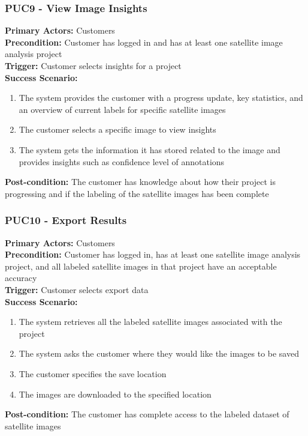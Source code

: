 \documentclass[12pt]{article}
\begin{document}
\subsubsection*{PUC9 - View Image Insights}
\label{sec:PUC9}
\textbf{Primary Actors:} Customers\\
\textbf{Precondition:} Customer has logged in and has at least one satellite image analysis project\\
\textbf{Trigger:} Customer selects insights for a project\\
\textbf{Success Scenario:}
\begin{enumerate}
    \item The system provides the customer with a progress update, key statistics, and an overview of current labels for specific satellite images
    \item The customer selects a specific image to view insights 
    \item The system gets the information it has stored related to the image and provides insights such as confidence level of annotations
\end{enumerate}
\textbf{Post-condition:} The customer has knowledge about how their project is progressing and if the labeling of the satellite images has been complete

\subsubsection*{PUC10 - Export Results}
\label{sec:PUC10}
\textbf{Primary Actors:} Customers\\
\textbf{Precondition:} Customer has logged in, has at least one satellite image analysis project, and all labeled satellite images in that project have an acceptable accuracy\\
\textbf{Trigger:} Customer selects export data\\
\textbf{Success Scenario:}
\begin{enumerate}
    \item The system retrieves all the labeled satellite images associated with the project
    \item The system asks the customer where they would like the images to be saved
    \item The customer specifies the save location
    \item The images are downloaded to the specified location
\end{enumerate}
\textbf{Post-condition:} The customer has complete access to the labeled dataset of satellite images
\end{document}
